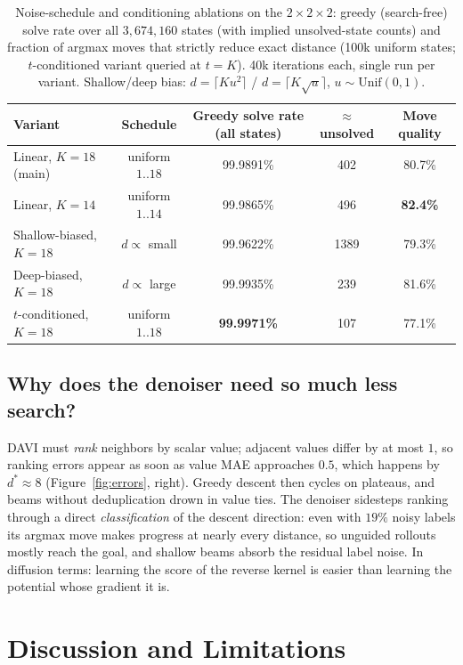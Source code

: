 \documentclass[11pt]{article}
\newcommand{\dstar}{d^{*}}
\begin{document}
\begin{table}[t]
\centering
\small
\begin{tabular}{lcccc}
\toprule
Variant & Schedule & Greedy solve rate (all states) & ${\approx}$unsolved & Move quality \\
\midrule
Linear, $K{=}18$ (main) & uniform $1..18$ & 99.9891\% & 402 & 80.7\% \\
Linear, $K{=}14$ & uniform $1..14$ & 99.9865\% & 496 & \textbf{82.4\%} \\
Shallow-biased, $K{=}18$ & $d \propto$ small & 99.9622\% & 1389 & 79.3\% \\
Deep-biased, $K{=}18$ & $d \propto$ large & 99.9935\% & 239 & 81.6\% \\
$t$-conditioned, $K{=}18$ & uniform $1..18$ & \textbf{99.9971\%} & 107 & 77.1\% \\
\bottomrule
\end{tabular}
\caption{Noise-schedule and conditioning ablations on the
$2{\times}2{\times}2$: greedy (search-free) solve rate over all
$3{,}674{,}160$ states (with implied unsolved-state counts) and fraction of
argmax moves that strictly reduce exact distance (100k uniform states;
$t$-conditioned variant queried at $t{=}K$). 40k iterations each, single run
per variant. Shallow/deep bias: $d = \lceil K u^2\rceil$ / $d = \lceil K
\sqrt{u}\rceil$, $u\sim\mathrm{Unif}(0,1)$.}
\label{tab:ablations}
\end{table}

\subsection{Why does the denoiser need so much less search?}

DAVI must \emph{rank} neighbors by scalar value; adjacent values differ by at
most $1$, so ranking errors appear as soon as value MAE approaches $0.5$,
which happens by $\dstar{\approx}8$ (Figure~\ref{fig:errors}, right). Greedy
descent then cycles on plateaus, and beams without deduplication drown in
value ties. The denoiser sidesteps ranking through a direct
\emph{classification} of the descent direction: even with $19\%$ noisy labels
its argmax move makes progress at nearly every distance, so unguided rollouts
mostly reach the goal, and shallow beams absorb the residual label noise. In
diffusion terms: learning the score of the reverse kernel is easier than
learning the potential whose gradient it is.

\section{Discussion and Limitations}
\label{sec:limitations}
\end{document}
